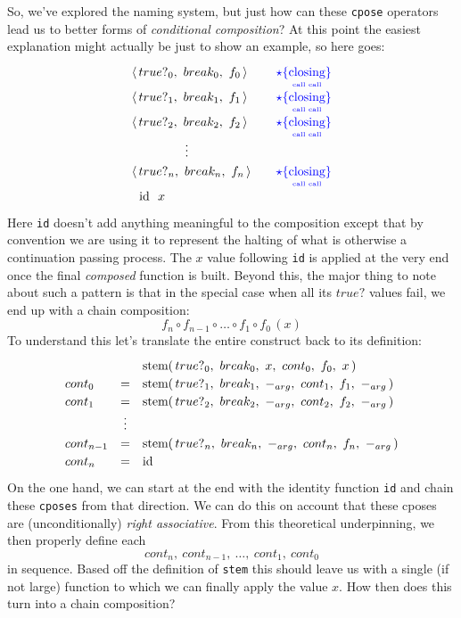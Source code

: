 \documentclass[twoside]{article}
\newcommand{\id}{\mbox{id}}
\newcommand{\stem}{\mbox{stem}}
\newcommand{\underpose}[2]{\ensuremath{\underset{\mbox{\tiny #2}}{\{\mbox{#1}\}}}}
\newcommand{\varstempose}[4]{\ensuremath{\textcolor{#1}{#2\underpose{#3}{#4}}}}
\newcommand{\spose}[2][blue]{\varstempose{#1}{\star}{closing}{#2}}
\begin{document}
So, we've explored the naming system, but just how can these \texttt{cpose} operators lead us to better forms of
\emph{conditional composition}? At this point the easiest explanation might actually be just to show an example,
so here goes:
$$ \def\arraystretch{1.25}
\begin{array}{lr}
\langle\,true?_0,\ break_0,\ f_0\,\rangle		& \quad\spose{call call}	\\
\langle\,true?_1,\ break_1,\ f_1\,\rangle		& \quad\spose{call call}	\\
\langle\,true?_2,\ break_2,\ f_2\,\rangle		& \quad\spose{call call}	\\

\hspace{1.5cm}\vdots						    			\\

\langle\,true?_n,\ break_n,\ f_n\,\rangle		& \quad\spose{call call}	\\
\hspace{1ex}\,\id\ \ x
\end{array} $$
Here \texttt{id} doesn't add anything meaningful to the composition except that by convention we are using it to represent
the halting of what is otherwise a continuation passing process. The $ x $ value following \texttt{id} is applied at the very
end once the final \emph{composed} function is built. Beyond this, the major thing to note about such a pattern is that
in the special case when all its $ true? $ values fail, we end up with a chain composition:
$$ f_n \circ f_{n-1} \circ \ldots \circ f_1 \circ f_0\,(x) $$
To understand this let's translate the entire construct back to its definition:
$$ \def\arraystretch{1.2}
\begin{array}{lcl}
		&   & \stem(\,true?_0,\ break_0,\ x,\ cont_0,\ f_0,\ x\,)					\\
cont_0		& = & \stem(\,true?_1,\ break_1,\ -_{arg},\ cont_1,\ f_1,\ -_{arg}\,)				\\
cont_1		& = & \stem(\,true?_2,\ break_2,\ -_{arg},\ cont_2,\ f_2,\ -_{arg}\,)				\\

		&\vdots&											\\

cont_{n-1}	& = & \stem(\,true?_n,\ break_n,\ -_{arg},\ cont_n,\ f_n,\ -_{arg}\,)				\\
cont_n		& = & \id
\end{array} $$
On the one hand, we can start at the end with the identity function \texttt{id} and chain these \texttt{cposes}
from that direction. We can do this on account that these cposes are (unconditionally) \emph{right associative}.
From this theoretical underpinning, we then properly define each
$$ cont_n,\ cont_{n-1},\ \ldots,\ cont_1,\ cont_0 $$
in sequence. Based off the definition of \texttt{stem} this should leave us with a single (if not large)
function to which we can finally apply the value $ x $. How then does this turn into a chain composition?
\end{document}
